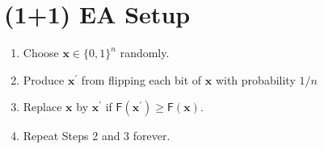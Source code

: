 \documentclass[a4paper, 12pt]{article}
\begin{document}
\section*{(1+1) EA Setup}
\begin{tcolorbox}[title={(1+1) EA}, colback=black!10, colframe=black!70, fonttitle=\bfseries]
    \begin{enumerate}
        \item Choose $\mathbf{x} \in \{0,1\}^n$ randomly.
        \item Produce $\mathbf{x}^\prime$ from flipping each bit of $\mathbf{x}$ with probability $1/n$
        \item Replace $\mathbf{x}$ by $\mathbf{x}^\prime$ if $\mathsf{F}(\mathbf{x}^\prime) \geq \mathsf{F}(\mathbf{x})$.
        \item Repeat Steps 2 and 3 forever.
    \end{enumerate}
\end{tcolorbox}
\end{document}
